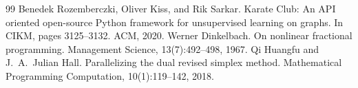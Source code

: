 \documentclass[12pt]{article}
\begin{document}
\setcounter{section}{5}


\begin{thebibliography}{99}
 Benedek Rozemberczki, Oliver Kiss, and Rik Sarkar. Karate Club: An API
  oriented open-source Python framework for unsupervised learning on graphs. In CIKM, pages
  3125--3132. ACM, 2020.
 Werner Dinkelbach. On nonlinear fractional programming.
  Management Science, 13(7):492--498, 1967.
 Qi Huangfu and J.~A.~Julian Hall. Parallelizing the dual revised simplex method.
  Mathematical Programming Computation, 10(1):119--142, 2018.
\end{thebibliography}
\end{document}
